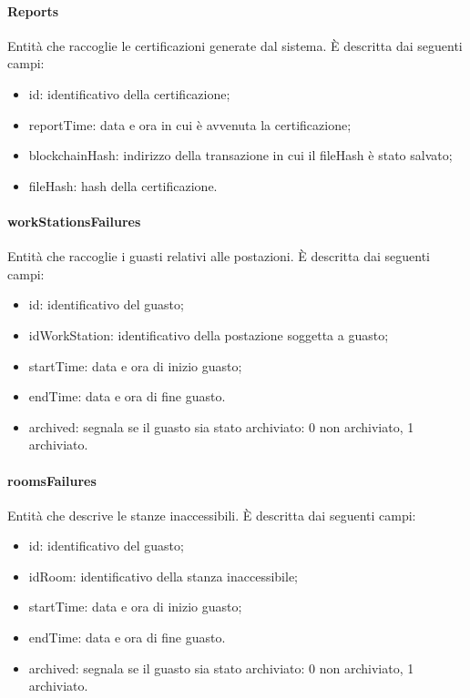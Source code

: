 \paragraph{Reports}
Entità che raccoglie le certificazioni generate dal sistema. È descritta dai seguenti campi:
\begin{itemize}
	\item id: identificativo della certificazione;
	\item reportTime: data e ora in cui è avvenuta la certificazione;
	\item blockchainHash: indirizzo della transazione in cui il fileHash è stato salvato;
	\item fileHash: hash della certificazione.
\end{itemize}

\paragraph{workStationsFailures}
Entità che raccoglie i guasti relativi alle postazioni. È descritta dai seguenti campi:
\begin{itemize}
	\item id: identificativo del guasto;
	\item idWorkStation: identificativo della postazione soggetta a guasto;
	\item startTime: data e ora di inizio guasto;
	\item endTime: data e ora di fine guasto.
	\item archived: segnala se il guasto sia stato archiviato: 0 non archiviato, 1 archiviato.
\end{itemize}

\paragraph{roomsFailures}
Entità che descrive le stanze inaccessibili. È descritta dai seguenti campi:
\begin{itemize}
	\item id: identificativo del guasto;
	\item idRoom: identificativo della stanza inaccessibile;
	\item startTime: data e ora di inizio guasto;
	\item endTime: data e ora di fine guasto.
	\item archived: segnala se il guasto sia stato archiviato: 0 non archiviato, 1 archiviato.
\end{itemize}

